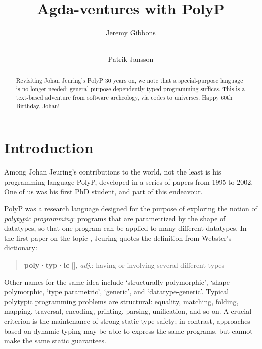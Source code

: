 \documentclass[fleqn,runningheads]{llncs}
\begin{document}
\title{Agda-ventures with PolyP}

\author{Jeremy Gibbons \and \\
Patrik Jansson}


\maketitle

\begin{abstract}
Revisiting Johan Jeuring's PolyP 30 years on, we note that a special-purpose language is no longer needed: general-purpose dependently typed programming suffices.
This is a text-based adventure from software archeology, via codes to universes.
Happy 60th Birthday, Johan!
\end{abstract}

\section{Introduction}

Among Johan Jeuring's contributions to the world, not the least is his programming language PolyP, developed in a series of papers from 1995 to 2002. One of us was his first PhD student, and part of this endeavour.

PolyP was a research language designed for the purpose of exploring the notion of \emph{polytypic programming}: programs that are parametrized by the shape of datatypes, so that one program can be applied to many different datatypes. In the first paper on the topic \cite{Jeuring95:Polytypic}, Jeuring quotes the definition from Webster's dictionary:
\begin{quote}
\textbf{poly·typ·ic}
[], \textit{adj}.:
having or involving several different types
\end{quote}
Other names for the same idea include
`structurally polymorphic', %
`shape polymorphic, %
`type parametric', %
`generic', %
and `datatype-generic'. %
Typical polytypic programming problems are structural:
equality,
matching, %
folding, mapping, %
traversal, encoding, printing, parsing, %
unification, %
and so on.
A crucial criterion is the maintenance of strong static type safety; in contrast, approaches based on dynamic typing may be able to express the same programs, but cannot make the same static guarantees.
\end{document}
